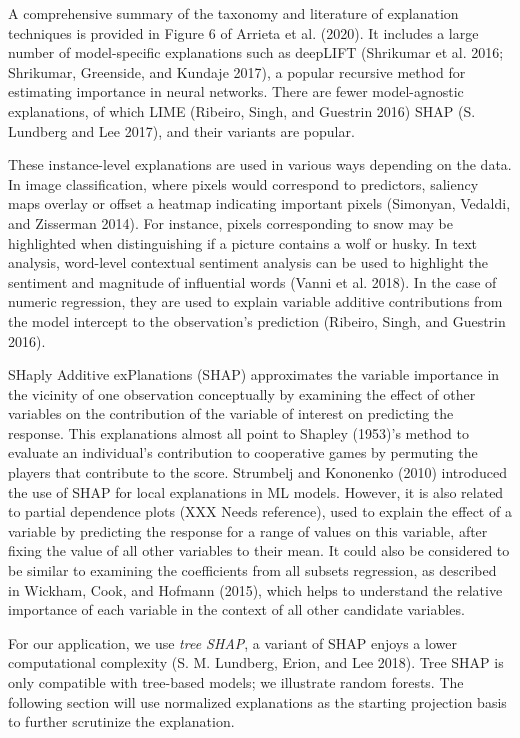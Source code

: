 \documentclass[
]{article}
\begin{document}
A comprehensive summary of the taxonomy and literature of explanation
techniques is provided in Figure 6 of Arrieta et al. (2020). It includes
a large number of model-specific explanations such as deepLIFT
(Shrikumar et al. 2016; Shrikumar, Greenside, and Kundaje 2017), a
popular recursive method for estimating importance in neural networks.
There are fewer model-agnostic explanations, of which LIME (Ribeiro,
Singh, and Guestrin 2016) SHAP (S. Lundberg and Lee 2017), and their
variants are popular.

These instance-level explanations are used in various ways depending on
the data. In image classification, where pixels would correspond to
predictors, saliency maps overlay or offset a heatmap indicating
important pixels (Simonyan, Vedaldi, and Zisserman 2014). For instance,
pixels corresponding to snow may be highlighted when distinguishing if a
picture contains a wolf or husky. In text analysis, word-level
contextual sentiment analysis can be used to highlight the sentiment and
magnitude of influential words (Vanni et al. 2018). In the case of
numeric regression, they are used to explain variable additive
contributions from the model intercept to the observation's prediction
(Ribeiro, Singh, and Guestrin 2016).

SHaply Additive exPlanations (SHAP) approximates the variable importance
in the vicinity of one observation conceptually by examining the effect
of other variables on the contribution of the variable of interest on
predicting the response. This explanations almost all point to Shapley
(1953)'s method to evaluate an individual's contribution to cooperative
games by permuting the players that contribute to the score. Strumbelj
and Kononenko (2010) introduced the use of SHAP for local explanations
in ML models. However, it is also related to partial dependence plots
(XXX Needs reference), used to explain the effect of a variable by
predicting the response for a range of values on this variable, after
fixing the value of all other variables to their mean. It could also be
considered to be similar to examining the coefficients from all subsets
regression, as described in Wickham, Cook, and Hofmann (2015), which
helps to understand the relative importance of each variable in the
context of all other candidate variables.

For our application, we use \emph{tree SHAP}, a variant of SHAP enjoys a
lower computational complexity (S. M. Lundberg, Erion, and Lee 2018).
Tree SHAP is only compatible with tree-based models; we illustrate
random forests. The following section will use normalized explanations
as the starting projection basis to further scrutinize the explanation.
\end{document}
